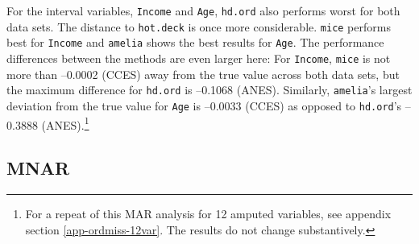 \documentclass[12pt,econ]{sources/authesis}
\begin{document}
For the interval variables, \texttt{Income} and \texttt{Age}, \texttt{hd.ord} also performs worst for both data sets. The distance to \texttt{hot.deck} is once more considerable. \texttt{mice} performs best for \texttt{Income} and \texttt{amelia} shows the best results for \texttt{Age}. The performance differences between the methods are even larger here: For \texttt{Income}, \texttt{mice} is not more than --0.0002 (CCES) away from the true value across both data sets, but the maximum difference for \texttt{hd.ord} is --0.1068 (ANES). Similarly, \texttt{amelia}'s largest deviation from the true value for \texttt{Age} is --0.0033 (CCES) as opposed to \texttt{hd.ord}'s --0.3888 (ANES).\footnote{For a repeat of this MAR analysis for 12 amputed variables, see appendix section \ref{app-ordmiss-12var}. The results do not change substantively.}

\hypertarget{ordmiss-results-mnar}{%
\subsection{MNAR}\label{ordmiss-results-mnar}}
\end{document}
